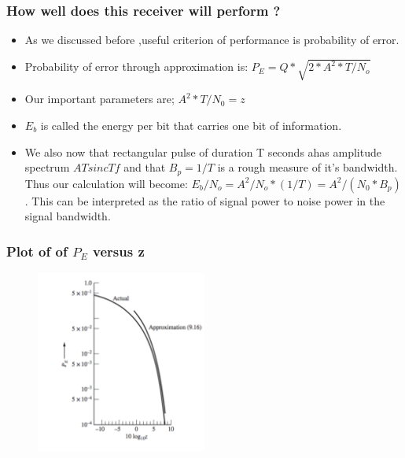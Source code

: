 \documentclass{beamer}
\begin{document}
			\begin{frame}
			\frametitle{How well does this receiver will perform ?}
			\begin{itemize}
			\item As we discussed before ,useful criterion of performance is probability of error.
			\item Probability of error through approximation is: $P_E= Q *\sqrt{2*A^2*T/N_o}$
			\item Our important parameters are; $A^2*T/N_0=z$
			\item $E_b$ is called the energy per bit that carries one bit of information.
			\item We also now that rectangular pulse of duration T seconds ahas amplitude spectrum $ATsincTf$ and that $B_p=1/T$ is a rough measure of it's bandwidth. Thus our calculation will become: $E_b/N_o=A^2/N_o*(1/T)=A^2/(N_0*B_p)$. This can be interpreted as the ratio of signal power to noise power in the signal bandwidth.
			\end{itemize}
			\end{frame}

			\begin{frame}
			\frametitle{Plot of of $P_E$ versus z}
			\begin{figure}
			\includegraphics[width=0.5\textwidth]{P_Egraph.png}
			\end{figure}
			\end{frame}
\end{document}
